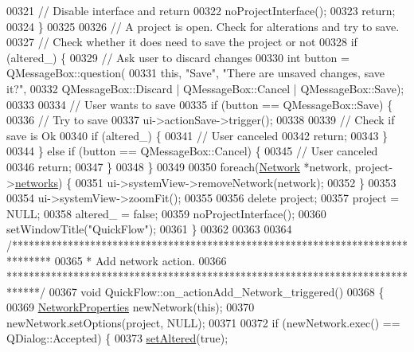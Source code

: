 \begin{DoxyCode}
00321     \textcolor{comment}{// Disable interface and return}
00322     noProjectInterface();
00323     \textcolor{keywordflow}{return};
00324   \}
00325 
00326   \textcolor{comment}{// A project is open. Check for alterations and try to save.}
00327   \textcolor{comment}{// Check whether it does need to save the project or not}
00328   \textcolor{keywordflow}{if} (altered\_) \{
00329     \textcolor{comment}{// Ask user to discard changes}
00330     \textcolor{keywordtype}{int} button = QMessageBox::question(
00331                    \textcolor{keyword}{this}, \textcolor{stringliteral}{"Save"}, \textcolor{stringliteral}{"There are unsaved changes, save it?"},
00332                    QMessageBox::Discard | QMessageBox::Cancel | QMessageBox::Save);
00333 
00334     \textcolor{comment}{// User wants to save}
00335     \textcolor{keywordflow}{if} (button == QMessageBox::Save) \{
00336       \textcolor{comment}{// Try to save}
00337       ui->actionSave->trigger();
00338 
00339       \textcolor{comment}{// Check if save is Ok}
00340       \textcolor{keywordflow}{if} (altered\_) \{
00341         \textcolor{comment}{// User canceled}
00342         \textcolor{keywordflow}{return};
00343       \}
00344     \} \textcolor{keywordflow}{else} \textcolor{keywordflow}{if} (button == QMessageBox::Cancel) \{
00345       \textcolor{comment}{// User canceled}
00346       \textcolor{keywordflow}{return};
00347     \}
00348   \}
00349 
00350   \textcolor{keywordflow}{foreach}(\hyperlink{class_network}{Network} *network, project->\hyperlink{class_project_aa98126154cab59769a431668e6f17daf}{networks}) \{
00351     ui->systemView->removeNetwork(network);
00352   \}
00353 
00354   ui->systemView->zoomFit();
00355 
00356   \textcolor{keyword}{delete} project;
00357   project = NULL;
00358   altered\_ = \textcolor{keyword}{false};
00359   noProjectInterface();
00360   setWindowTitle(\textcolor{stringliteral}{"QuickFlow"});
00361 \}
00362 
00363 
00364 \textcolor{comment}{/*******************************************************************************}
00365 \textcolor{comment}{* Add network action.}
00366 \textcolor{comment}{******************************************************************************/}
00367 \textcolor{keywordtype}{void} QuickFlow::on\_actionAdd\_Network\_triggered()
00368 \{
00369   \hyperlink{class_network_properties}{NetworkProperties} newNetwork(\textcolor{keyword}{this});
00370   newNetwork.setOptions(project, NULL);
00371 
00372   \textcolor{keywordflow}{if} (newNetwork.exec() == QDialog::Accepted) \{
00373     \hyperlink{group___window_ga4b63ea5ca52a9eea14db0a22b5a133f8}{setAltered}(\textcolor{keyword}{true});

\end{DoxyCode}
